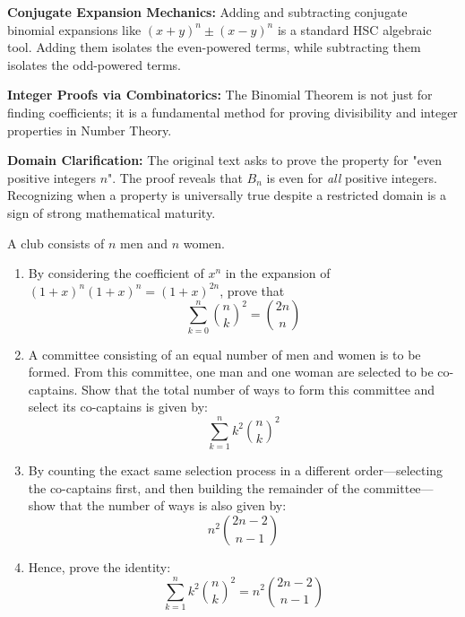 \begin{takeaways}
    \item \textbf{Conjugate Expansion Mechanics:} Adding and subtracting conjugate binomial expansions like $(x+y)^n \pm (x-y)^n$ is a standard HSC algebraic tool. Adding them isolates the even-powered terms, while subtracting them isolates the odd-powered terms.
    \item \textbf{Integer Proofs via Combinatorics:} The Binomial Theorem is not just for finding coefficients; it is a fundamental method for proving divisibility and integer properties in Number Theory.
    \item \textbf{Domain Clarification:} The original text asks to prove the property for "even positive integers $n$". The proof reveals that $B_n$ is even for \textit{all} positive integers. Recognizing when a property is universally true despite a restricted domain is a sign of strong mathematical maturity.
\end{takeaways}

\begin{problem}
  A club consists of $n$ men and $n$ women. 
  
  \begin{enumerate}[label=\roman*., leftmargin=*]
      \item By considering the coefficient of $x^n$ in the expansion of $(1+x)^n(1+x)^n = (1+x)^{2n}$, prove that $$\sum_{k=0}^{n} \binom{n}{k}^2 = \binom{2n}{n}$$
      \item A committee consisting of an equal number of men and women is to be formed. From this committee, one man and one woman are selected to be co-captains. Show that the total number of ways to form this committee and select its co-captains is given by: $$\sum_{k=1}^{n} k^2 \binom{n}{k}^2$$
      \item By counting the exact same selection process in a different order---selecting the co-captains first, and then building the remainder of the committee---show that the number of ways is also given by: $$n^2 \binom{2n-2}{n-1}$$
      \item Hence, prove the identity: $$\sum_{k=1}^{n} k^2 \binom{n}{k}^2 = n^2 \binom{2n-2}{n-1}$$
  \end{enumerate}
\end{problem}


